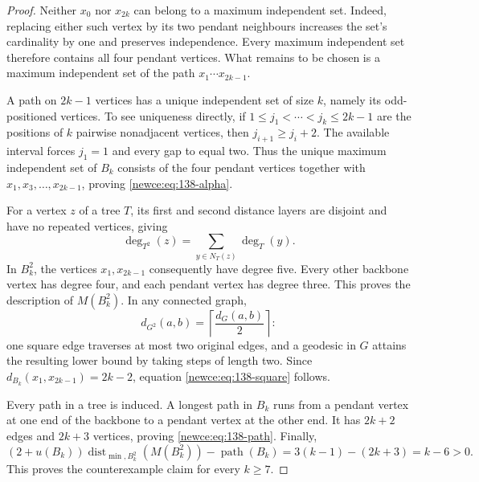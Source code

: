 \documentclass[11pt,a4paper]{article}
\theoremstyle{remark}
\begin{document}
\begin{proof}
Neither $x_0$ nor $x_{2k}$ can belong to a maximum independent set.
Indeed, replacing either such vertex by its two pendant neighbours
increases the set's cardinality by one and preserves independence.
Every maximum independent set therefore contains all four pendant
vertices.  What remains to be chosen is a maximum independent set of
the path $x_1\cdots x_{2k-1}$.

A path on $2k-1$ vertices has a unique independent set of size $k$,
namely its odd-positioned vertices.  To see uniqueness directly, if
$1\le j_1<\cdots<j_k\le2k-1$ are the positions of $k$ pairwise
nonadjacent vertices, then $j_{i+1}\ge j_i+2$.  The available interval
forces $j_1=1$ and every gap to equal two.  Thus the unique maximum
independent set of $B_k$ consists of the four pendant vertices together
with $x_1,x_3,\ldots,x_{2k-1}$, proving
\eqref{newce:eq:138-alpha}.

For a vertex $z$ of a tree $T$, its first and second distance layers are
disjoint and have no repeated vertices, giving
\[
\deg_{T^2}(z)=\sum_{y\in N_T(z)}\deg_T(y).
\]
In $B_k^2$, the vertices $x_1,x_{2k-1}$ consequently have degree five.
Every other backbone vertex has degree four, and each pendant vertex
has degree three.  This proves the description of $M(B_k^2)$.
In any connected graph,
\[
d_{G^2}(a,b)=\left\lceil\frac{d_G(a,b)}2\right\rceil:
\]
one square edge traverses at most two original edges, and a geodesic
in $G$ attains the resulting lower bound by taking steps of length two.
Since $d_{B_k}(x_1,x_{2k-1})=2k-2$, equation
\eqref{newce:eq:138-square} follows.

Every path in a tree is induced.  A longest path in $B_k$ runs from a
pendant vertex at one end of the backbone to a pendant vertex at the
other end.  It has $2k+2$ edges and $2k+3$ vertices, proving
\eqref{newce:eq:138-path}.  Finally,
\[
(2+u(B_k))\operatorname{dist}_{\min,B_k^2}(M(B_k^2))
       -\operatorname{path}(B_k)
   =3(k-1)-(2k+3)=k-6>0.
\]
This proves the counterexample claim for every $k\ge7$.
\end{proof}
\end{document}
